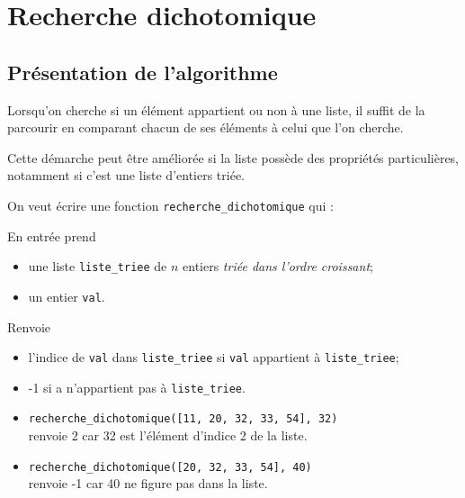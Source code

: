 
\chapter{Recherche dichotomique}

\section{Présentation de l'algorithme}

Lorsqu'on cherche si un élément appartient ou non à une liste, il suffit de la parcourir en comparant chacun de ses éléments à celui que l'on cherche.

Cette démarche peut être améliorée si la liste possède des propriétés particulières, notamment si c'est une liste d'entiers triée.


On veut écrire une fonction \texttt{recherche\_dichotomique} qui :

En entrée prend \begin{itemize}
		      \item 	une liste \texttt{liste_triee} de $n$ entiers \textit{triée dans l'ordre croissant};
		      \item 	un entier \texttt{val}.
	      \end{itemize}
Renvoie \begin{itemize}
		      \item 	l'indice de \texttt{val} dans \texttt{liste_triee} si \texttt{val} appartient à \texttt{liste_triee};
		      \item 	-1 si a n'appartient pas à \texttt{liste_triee}.
	      \end{itemize}



\begin{exemple}[]
	\begin{itemize}
		\item 	\texttt{recherche_dichotomique([11, 20, 32, 33, 54], 32)} \\renvoie 2 car 32 est l'élément d'indice 2 de la liste.
		\item 	\texttt{recherche_dichotomique([20, 32, 33, 54], 40)} \\renvoie -1 car 40 ne figure pas dans la liste.
	\end{itemize}
\end{exemple}


